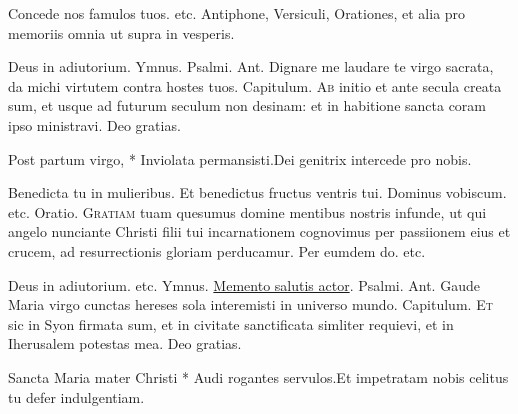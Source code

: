 \begin{multicols*}{2}
{\zallmancaps \color{Red} C}{oncede} nos famulos tuos. etc.
{\color{Red} Antiphone, Versiculi, Orationes, et alia pro memoriis omnia ut supra in vesperis.}
{\color{Red} }
\par \noindent Deus in adiutorium. {\color{Red} Ymnus.}
{\color{Red} Psalmi.}
{\color{Red} Ant.} Dignare me laudare te virgo sacrata, da michi virtutem contra hostes tuos. {\color{Red} Capitulum.}
\lettrine[lines=2]{\zallmancaps \color{Blue} A}{b} initio et ante secula creata sum, et usque ad futurum seculum non desinam: et in habitione sancta coram ipso ministravi. Deo gratias.
\begin{responsory-breve}
{Post partum virgo, * Inviolata permansisti.}{Dei genitrix intercede pro nobis.}
\end{responsory-breve}
\V Benedicta tu in mulieribus. \R Et benedictus fructus ventris tui. Dominus vobiscum. etc. {\color{Red} Oratio.}
\lettrine[lines=2]{\zallmancaps \color{Red} G}{ratiam} tuam quesumus domine mentibus nostris infunde, ut qui angelo nunciante Christi filii tui incarnationem cognovimus per passiionem eius et crucem, ad resurrectionis gloriam perducamur. Per eumdem do. etc.
{\color{Red} }
\par \noindent Deus in adiutorium. etc. {\color{Red} Ymnus.} \hyperlink{memento-salutis}{Memento salutis actor}. {\color{Red} Psalmi.}
{\color{Red} Ant.} Gaude Maria virgo cunctas hereses sola interemisti in universo mundo. {\color{Red} Capitulum.}
\lettrine[lines=2]{\zallmancaps \color{Blue} E}{t} sic in Syon firmata sum, et in civitate sanctificata simliter requievi, et in Iherusalem potestas mea. Deo gratias.
\begin{responsory-breve}
{Sancta Maria mater Christi * Audi rogantes servulos.}{Et impetratam nobis celitus tu defer indulgentiam.}

\end{responsory-breve}
\end{multicols*}

